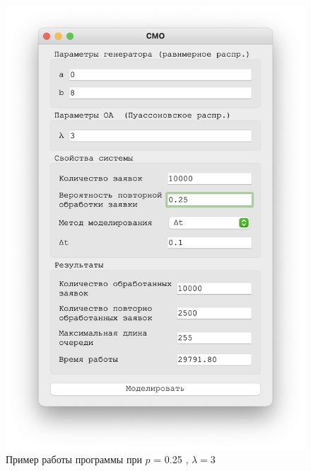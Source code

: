 \begin{figure}[!htb]
\begin{minipage}{0.55\textwidth}
      \includegraphics[width=1\linewidth]{3-25-t}
    \end{minipage}
    \caption{Пример работы программы при $p$ = 0.25 , $\lambda = 3$}
 \end{figure}


